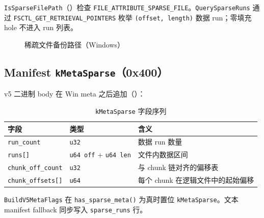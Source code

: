 \texttt{IsSparseFilePath}（）检查 \texttt{FILE\_ATTRIBUTE\_SPARSE\_FILE}。\texttt{QuerySparseRuns} 通过 \texttt{FSCTL\_GET\_RETRIEVAL\_POINTERS} 枚举 \texttt{(offset, length)} 数据 run；零填充 hole 不进入 run 列表。

\begin{figure}[htbp]
\centering
{}
\caption{稀疏文件备份路径（Windows）}
\label{fig:sparse-backup-flow}
\end{figure}

\subsection{Manifest \texttt{kMetaSparse}（0x400）}

v5 二进制 body 在 Win meta 之后追加（）：

\begin{longtable}{@{}llp{8cm}@{}}
\caption{\texttt{kMetaSparse} 字段序列} \\
\toprule
字段 & 类型 & 含义 \\
\midrule
\texttt{run\_count} & \texttt{u32} & 数据 run 数量 \\
\texttt{runs[]} & \texttt{u64 off} + \texttt{u64 len} & 文件内数据区间 \\
\texttt{chunk\_off\_count} & \texttt{u32} & 与 chunk 链对齐的偏移表 \\
\texttt{chunk\_offsets[]} & \texttt{u64} & 每个 chunk 在逻辑文件中的起始偏移 \\
\bottomrule
\end{longtable}

\texttt{BuildV5MetaFlags} 在 \texttt{has\_sparse\_meta()} 为真时置位 \texttt{kMetaSparse}。文本 manifest fallback 同步写入 \texttt{sparse\_runs} 行。

